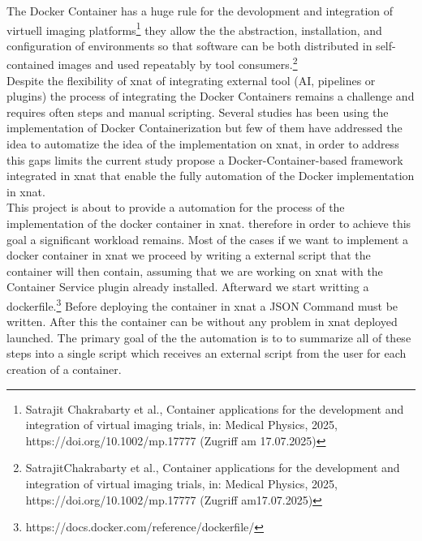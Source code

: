 The Docker Container has a huge rule for the devolopment and integration of virtuell imaging platforms\footnote{Satrajit Chakrabarty et al., Container applications for the development and integration of virtual imaging trials, in: Medical Physics, 2025, https://doi.org/10.1002/mp.17777 (Zugriff am 17.07.2025)} they allow the the abstraction, installation, and configuration of environments so that software can be both distributed in self-contained images and used repeatably by tool consumers.\footnote{SatrajitChakrabarty et al., Container applications for the development and integration of virtual imaging trials, in: Medical Physics, 2025, https://doi.org/10.1002/mp.17777 (Zugriff am17.07.2025)}\\ Despite the flexibility of xnat of integrating external tool (AI, pipelines or plugins) the process of integrating the Docker Containers remains a challenge and requires often steps and manual scripting. Several studies has been using the implementation  of Docker Containerization but few of them have addressed  the idea to automatize the idea of the implementation on xnat, in order to address this gaps limits the current study propose a Docker-Container-based framework integrated in xnat that enable the fully automation of the Docker implementation in xnat. 
\\
 This project is about  to provide a automation for the process of the implementation of the docker container in xnat. therefore in order to achieve this goal a significant workload remains.
Most of the cases if we want to implement a docker container in xnat we proceed by writing a external script that the container will then contain, assuming that we are  working on xnat  with the Container Service plugin already installed. Afterward we start writting a dockerfile.\footnote{https://docs.docker.com/reference/dockerfile/} Before deploying the container in xnat a JSON Command must be written. After this the container can be without any problem in xnat deployed launched. The primary goal of the the automation is to to summarize all of these steps into  a single script which receives an external script from the user for each creation of a container.\\
 


 

